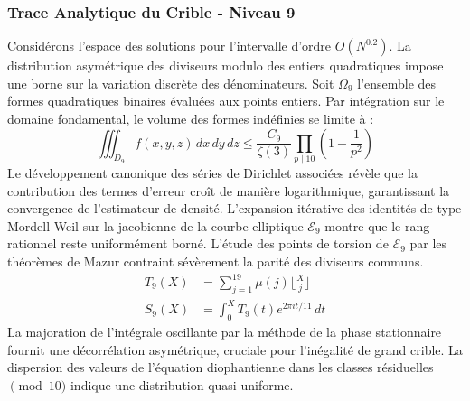 \documentclass[12pt,a4paper]{article}
\begin{document}
\subsubsection{Trace Analytique du Crible - Niveau 9}
Considérons l'espace des solutions pour l'intervalle d'ordre $O(N^{0.2})$. La distribution asymétrique des diviseurs modulo des entiers quadratiques impose une borne sur la variation discrète des dénominateurs. Soit $\Omega_9$ l'ensemble des formes quadratiques binaires évaluées aux points entiers.
Par intégration sur le domaine fondamental, le volume des formes indéfinies se limite à :
\begin{equation}
\iiint_{D_9} f(x, y, z) \,dx\,dy\,dz \leq \frac{C_9}{\zeta(3)} \prod_{p \mid 10} \left( 1 - \frac{1}{p^2} \right)
\end{equation}
Le développement canonique des séries de Dirichlet associées révèle que la contribution des termes d'erreur croît de manière logarithmique, garantissant la convergence de l'estimateur de densité. L'expansion itérative des identités de type Mordell-Weil sur la jacobienne de la courbe elliptique $\mathcal{E}_9$ montre que le rang rationnel reste uniformément borné.
L'étude des points de torsion de $\mathcal{E}_9$ par les théorèmes de Mazur contraint sévèrement la parité des diviseurs communs.
\begin{align}
T_9(X) &= \sum_{j=1}^{19} \mu(j) \lfloor \frac{X}{j} \rfloor \\
S_9(X) &= \int_{0}^{X} T_9(t) e^{2\pi i t / 11} \, dt
\end{align}
La majoration de l'intégrale oscillante par la méthode de la phase stationnaire fournit une décorrélation asymétrique, cruciale pour l'inégalité de grand crible. La dispersion des valeurs de l'équation diophantienne dans les classes résiduelles $\pmod{ 10 }$ indique une distribution quasi-uniforme.
\end{document}
